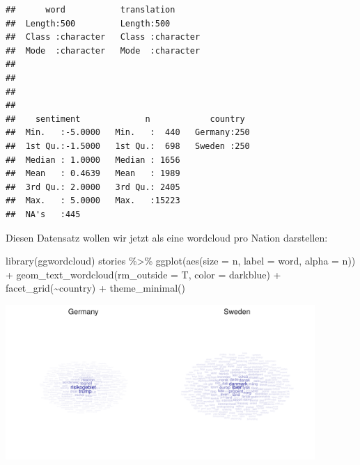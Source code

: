 \documentclass[
]{book}
\newenvironment{Shaded}{\begin{snugshade}}{\end{snugshade}}
\newcommand{\AttributeTok}[1]{\textcolor[rgb]{0.77,0.63,0.00}{#1}}
\newcommand{\FunctionTok}[1]{\textcolor[rgb]{0.00,0.00,0.00}{#1}}
\newcommand{\NormalTok}[1]{#1}
\newcommand{\SpecialCharTok}[1]{\textcolor[rgb]{0.00,0.00,0.00}{#1}}
\newcommand{\StringTok}[1]{\textcolor[rgb]{0.31,0.60,0.02}{#1}}
\begin{document}
\begin{verbatim}
##      word           translation       
##  Length:500         Length:500        
##  Class :character   Class :character  
##  Mode  :character   Mode  :character  
##                                       
##                                       
##                                       
##                                       
##    sentiment             n            country   
##  Min.   :-5.0000   Min.   :  440   Germany:250  
##  1st Qu.:-1.5000   1st Qu.:  698   Sweden :250  
##  Median : 1.0000   Median : 1656                
##  Mean   : 0.4639   Mean   : 1989                
##  3rd Qu.: 2.0000   3rd Qu.: 2405                
##  Max.   : 5.0000   Max.   :15223                
##  NA's   :445
\end{verbatim}

Diesen Datensatz wollen wir jetzt als eine wordcloud pro Nation darstellen:

\begin{Shaded}
\begin{Highlighting}[]
\FunctionTok{library}\NormalTok{(ggwordcloud)}
\NormalTok{stories }\SpecialCharTok{\%\textgreater{}\%} 
  \FunctionTok{ggplot}\NormalTok{(}\FunctionTok{aes}\NormalTok{(}\AttributeTok{size =}\NormalTok{ n, }
             \AttributeTok{label =}\NormalTok{ word,}
             \AttributeTok{alpha =}\NormalTok{ n)) }\SpecialCharTok{+}
  \FunctionTok{geom\_text\_wordcloud}\NormalTok{(}\AttributeTok{rm\_outside =}\NormalTok{ T,}
                      \AttributeTok{color =} \StringTok{\textquotesingle{}darkblue\textquotesingle{}}\NormalTok{) }\SpecialCharTok{+}
  \FunctionTok{facet\_grid}\NormalTok{(}\SpecialCharTok{\textasciitilde{}}\NormalTok{country) }\SpecialCharTok{+}
  \FunctionTok{theme\_minimal}\NormalTok{()}
\end{Highlighting}
\end{Shaded}

\begin{flushleft}\includegraphics[width=333.333333333333pt]{imgs/wc} \end{flushleft}
\end{document}
